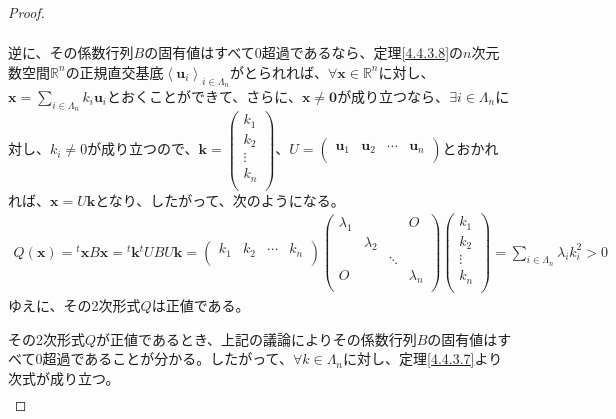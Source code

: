 \documentclass[dvipdfmx]{jsarticle}
\begin{document}
\begin{proof}
\begin{align*}
\end{align*}\par
逆に、その係数行列$B$の固有値はすべて$0$超過であるなら、定理\ref{4.4.3.8}の$n$次元数空間$\mathbb{R}^{n}$の正規直交基底$\left\langle \mathbf{u}_{i} \right\rangle_{i \in \varLambda_{n}}$がとられれば、$\forall\mathbf{x} \in \mathbb{R}^{n}$に対し、$\mathbf{x} = \sum_{i \in \varLambda_{n}} {k_{i}\mathbf{u}_{i}}$とおくことができて、さらに、$\mathbf{x} \neq \mathbf{0}$が成り立つなら、$\exists i \in \varLambda_{n}$に対し、$k_{i} \neq 0$が成り立つので、$\mathbf{k} = \begin{pmatrix}
k_{1} \\
k_{2} \\
 \vdots \\
k_{n} \\
\end{pmatrix}$、$U = \begin{pmatrix}
\mathbf{u}_{1} & \mathbf{u}_{2} & \cdots & \mathbf{u}_{n} \\
\end{pmatrix}$とおかれれば、$\mathbf{x} = U\mathbf{k}$となり、したがって、次のようになる。
\begin{align*}
Q\left( \mathbf{x} \right) ={}^t \mathbf{x}B\mathbf{x} ={}^t \mathbf{k}{}^t UBU\mathbf{k} = \begin{pmatrix}
k_{1} & k_{2} & \cdots & k_{n} \\
\end{pmatrix}\begin{pmatrix}
\lambda_{1} & \  & \  & O \\
\  & \lambda_{2} & \  & \  \\
\  & \  & \ddots & \  \\
O & \  & \  & \lambda_{n} \\
\end{pmatrix}\begin{pmatrix}
k_{1} \\
k_{2} \\
 \vdots \\
k_{n} \\
\end{pmatrix} = \sum_{i \in \varLambda_{n}} {\lambda_{i}k_{i}^{2}} > 0
\end{align*}
ゆえに、その2次形式$Q$は正値である。\par
その2次形式$Q$が正値であるとき、上記の議論によりその係数行列$B$の固有値はすべて$0$超過であることが分かる。したがって、$\forall k \in \varLambda_{n}$に対し、定理\ref{4.4.3.7}より次式が成り立つ。
\begin{align*}

\end{align*}
\end{proof}
\end{document}

